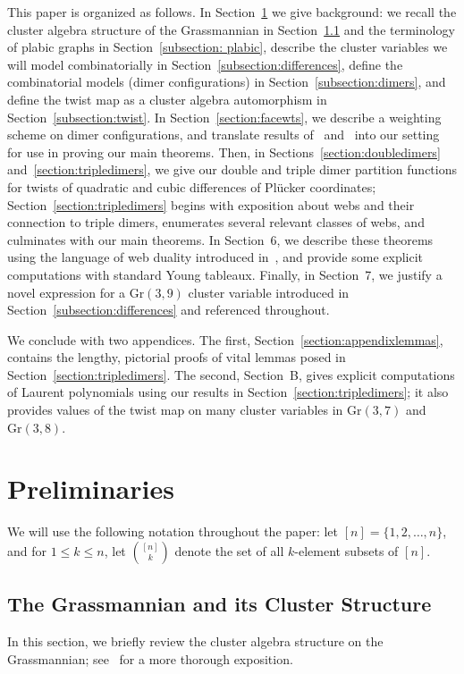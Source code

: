 \documentclass[11pt]{article}
\theoremstyle{definition}
\numberwithin{equation}{section}
\def\Gr {{\textrm{Gr}}}
\numberwithin{equation}{section}
\begin{document}
This paper is organized as follows. In Section~\ref{section::prelims} we give background: we recall the cluster algebra structure of the Grassmannian in Section~\ref{subsection: clusteralgbackground} and the terminology of plabic graphs in Section~\ref{subsection: plabic}, describe the cluster variables we will model combinatorially in Section~\ref{subsection:differences}, define the combinatorial models (dimer configurations) in Section~\ref{subsection:dimers}, and define the twist map as a cluster algebra automorphism in Section~\ref{subsection:twist}. In Section~\ref{section:facewts}, we describe a weighting scheme on dimer configurations, and translate results of~\cite{marshscott2016} and~\cite{mullerspeyer} into our setting for use in proving our main theorems. Then, in Sections~\ref{section:doubledimers} and~\ref{section:tripledimers}, we give our double and triple dimer partition functions for twists of quadratic and cubic differences of Pl\"ucker coordinates; Section~\ref{section:tripledimers} begins with exposition about webs and their connection to triple dimers, enumerates several relevant classes of webs, and culminates with our main theorems.
In Section~6, we describe these theorems using the language of web duality introduced in~\cite{fll2019}, and provide some explicit computations with standard Young tableaux. 
Finally, in Section~7, we justify a novel expression for a $\Gr(3,9)$ cluster variable introduced in Section~\ref{subsection:differences} and referenced throughout.

We conclude with two appendices. The first, Section~\ref{section:appendixlemmas}, contains the lengthy, pictorial proofs of vital lemmas posed in Section~\ref{section:tripledimers}. The second, Section~B, gives explicit computations of Laurent polynomials using our results in Section~\ref{section:tripledimers}; it also provides values of the twist map on many cluster variables in $\Gr(3,7)$ and $\Gr(3,8)$.

\section{Preliminaries} \label{section::prelims}
We will use the following notation throughout the paper: let $[n] = \{1,2, \dots, n\}$, and for $1 \leq k \leq n$, let $\binom{[n]}{k}$ denote the set of all $k$-element subsets of $[n]$.

\subsection{The Grassmannian and its Cluster Structure} \label{subsection: clusteralgbackground}
In this section, we briefly review the cluster algebra structure on the Grassmannian; see~\cite{fwz-ch6} for a more thorough exposition.
\end{document}
